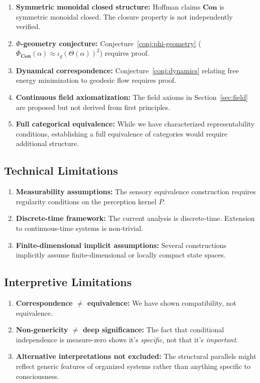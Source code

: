 \documentclass[11pt,a4paper]{article}
\theoremstyle{definition}
\theoremstyle{plain}
\theoremstyle{remark}
\newcommand{\Con}{\mathbf{Con}}
\begin{document}
\begin{enumerate}
    \item \textbf{Symmetric monoidal closed structure:} Hoffman claims $\Con$ is symmetric monoidal closed. The closure property is not independently verified.

    \item \textbf{$\Phi$-geometry conjecture:} Conjecture~\ref{conj:phi-geometry} ($\Phi_{\Con}(\alpha) \approx \iota_g(\Theta(\alpha))^2$) requires proof.

    \item \textbf{Dynamical correspondence:} Conjecture~\ref{conj:dynamics} relating free energy minimization to geodesic flow requires proof.

    \item \textbf{Continuous field axiomatization:} The field axioms in Section~\ref{sec:field} are proposed but not derived from first principles.

    \item \textbf{Full categorical equivalence:} While we have characterized representability conditions, establishing a full equivalence of categories would require additional structure.
\end{enumerate}

\subsection{Technical Limitations}

\begin{enumerate}
    \item \textbf{Measurability assumptions:} The sensory equivalence construction requires regularity conditions on the perception kernel $P$.

    \item \textbf{Discrete-time framework:} The current analysis is discrete-time. Extension to continuous-time systems is non-trivial.

    \item \textbf{Finite-dimensional implicit assumptions:} Several constructions implicitly assume finite-dimensional or locally compact state spaces.
\end{enumerate}

\subsection{Interpretive Limitations}

\begin{enumerate}
    \item \textbf{Correspondence $\neq$ equivalence:} We have shown compatibility, not equivalence.

    \item \textbf{Non-genericity $\neq$ deep significance:} The fact that conditional independence is measure-zero shows it's \emph{specific}, not that it's \emph{important}.

    \item \textbf{Alternative interpretations not excluded:} The structural parallels might reflect generic features of organized systems rather than anything specific to consciousness.
\end{enumerate}
\end{document}
